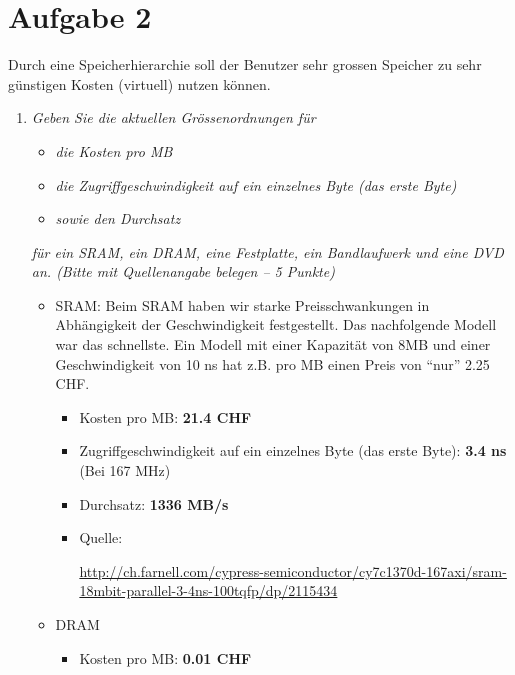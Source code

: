 \documentclass[10pt]{article}
\begin{document}
\newpage

\section*{Aufgabe 2}
Durch eine Speicherhierarchie soll der Benutzer sehr grossen Speicher zu sehr günstigen Kosten (virtuell) nutzen können.
\begin{enumerate}[label=\alph*)]
	\item
		\textit{Geben Sie die aktuellen Grössenordnungen für}
			\begin{itemize}
				\item \textit{die Kosten pro MB}
				\item \textit{die Zugriffgeschwindigkeit auf ein einzelnes Byte (das erste Byte)}
				\item \textit{sowie den Durchsatz}
			\end{itemize}
		\textit{für ein SRAM, ein DRAM, eine Festplatte, ein Bandlaufwerk und eine DVD an. (Bitte mit Quellenangabe belegen – 5 Punkte)}
			
			\begin{itemize}
			
				\item SRAM: 
					Beim SRAM haben wir starke Preisschwankungen in Abhängigkeit der Geschwindigkeit festgestellt. Das nachfolgende Modell war das schnellste. Ein Modell mit einer Kapazität von 8MB und einer Geschwindigkeit von 10 ns hat z.B. pro MB einen Preis von "`nur"' 2.25 CHF.
					\begin{itemize}
						\item Kosten pro MB: \textbf{21.4 CHF}
						
						\item Zugriffgeschwindigkeit auf ein einzelnes Byte (das erste Byte): \textbf{3.4 ns} (Bei 167 MHz)
						
						\item Durchsatz: \textbf{1336 MB/s}
						
						\item Quelle:
							
							\url{http://ch.farnell.com/cypress-semiconductor/cy7c1370d-167axi/sram-18mbit-parallel-3-4ns-100tqfp/dp/2115434}
						
					\end{itemize}

				\item DRAM
					\begin{itemize}
						\item Kosten pro MB: \textbf{0.01 CHF}
						

\end{itemize}
\end{itemize}
\end{enumerate}
\end{document}
